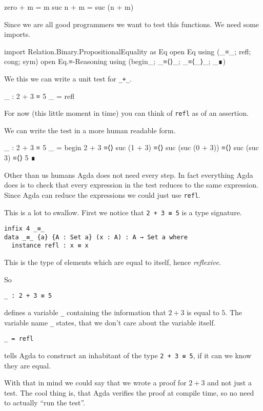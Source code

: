 \begin{code}
zero + m = m
suc n + m = suc (n + m)
\end{code}

Since we are all good programmers we want to test this functions.
We need some imports.
\begin{code}
import Relation.Binary.PropositionalEquality as Eq
open Eq using (_≡_; refl; cong; sym)
open Eq.≡-Reasoning using (begin_; _≡⟨⟩_; _≡⟨_⟩_; _∎)
\end{code}

We this we can write a unit test for \verb=_+_=.
\begin{code}
_ : 2 + 3 ≡ 5
_ = refl
\end{code}
For now (this little moment in time) you can think of \verb+refl+ as
of an assertion.

We can write the test in a more human readable form.
\begin{code}
_ : 2 + 3 ≡ 5
_ =
  begin
    2 + 3
  ≡⟨⟩
    suc (1 + 3)
  ≡⟨⟩
    suc (suc (0 + 3))
  ≡⟨⟩
    suc (suc 3)
  ≡⟨⟩
    5
  ∎
\end{code}
Other than us humans Agda does not need every step. In fact everything Agda does is to check
that every expression
in the test reduces to the same expression. Since Agda can reduce the expressions
we could just use \verb+refl+.

This is a lot to swallow. First we notice that \verb=2 + 3 ≡ 5= is a type signature.

\begin{verbatim}
infix 4 _≡_
data _≡_ {a} {A : Set a} (x : A) : A → Set a where
  instance refl : x ≡ x
\end{verbatim}
This is the type of elements which are equal to itself, hence \emph{reflexive}.

So
\begin{verbatim}
_ : 2 + 3 ≡ 5
\end{verbatim}
defines a variable \verb+_+ containing the information that $2+3$ is equal to $5$.
The variable name \verb+_+ states, that we don't care about the variable itself.

\begin{verbatim}
_ = refl
\end{verbatim}
tells Agda to construct an inhabitant of the type \verb=2 + 3 ≡ 5=, if it can
we know they are equal.

With that in mind we could say that we wrote a proof for $2+3$ and not just a test.
The cool thing is, that Agda verifies the proof at compile time, so no need to
actually “run the test”.

